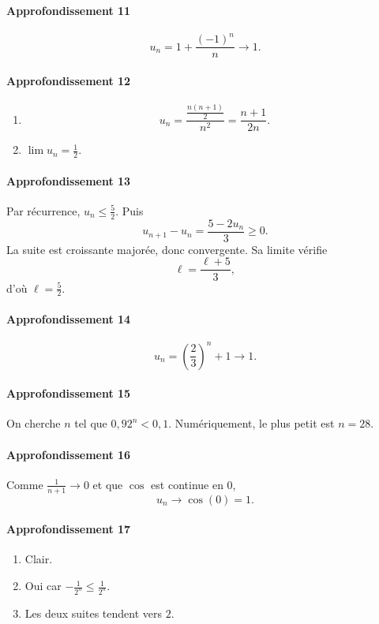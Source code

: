 \documentclass[11pt,a4paper]{article}
\theoremstyle{definition}
\begin{document}
\paragraph{Approfondissement 11}
\[
u_n=1+\frac{(-1)^n}{n}\to1.
\]

\paragraph{Approfondissement 12}
\begin{enumerate}[label=\arabic*.]
    \item
    \[
    u_n=\frac{\frac{n(n+1)}2}{n^2}=\frac{n+1}{2n}.
    \]
    \item $\lim u_n=\frac12$.
\end{enumerate}

\paragraph{Approfondissement 13}
Par récurrence, $u_n\le \frac52$.  
Puis
\[
u_{n+1}-u_n=\frac{5-2u_n}{3}\ge0.
\]
La suite est croissante majorée, donc convergente.  
Sa limite vérifie
\[
\ell=\frac{\ell+5}{3},
\]
d'où $\ell=\frac52$.

\paragraph{Approfondissement 14}
\[
u_n=\left(\frac23\right)^n+1\to1.
\]

\paragraph{Approfondissement 15}
On cherche $n$ tel que $0{,}92^n<0{,}1$. Numériquement, le plus petit est $n=28$.

\paragraph{Approfondissement 16}
Comme $\frac1{n+1}\to0$ et que $\cos$ est continue en $0$,
\[
u_n\to \cos(0)=1.
\]

\paragraph{Approfondissement 17}
\begin{enumerate}[label=\arabic*.]
    \item Clair.
    \item Oui car $-\frac1{2^n}\le \frac1{2^n}$.
    \item Les deux suites tendent vers $2$.
\end{enumerate}
\end{document}
